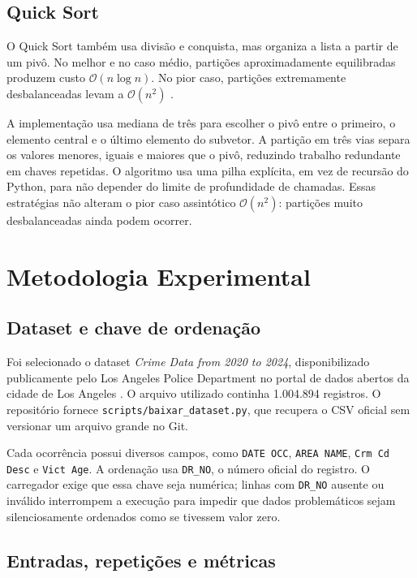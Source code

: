 \documentclass[12pt]{article}
\begin{document}
\subsection{Quick Sort}

O Quick Sort também usa divisão e conquista, mas organiza a lista a partir de
um pivô. No melhor e no caso médio, partições aproximadamente equilibradas
produzem custo $\mathcal{O}(n\log n)$. No pior caso, partições extremamente
desbalanceadas levam a $\mathcal{O}(n^2)$ \cite{cormen}.

A implementação usa mediana de três para escolher o pivô entre o primeiro, o
elemento central e o último elemento do subvetor. A partição em três vias
separa os valores menores, iguais e maiores que o pivô, reduzindo trabalho
redundante em chaves repetidas. O algoritmo usa uma pilha explícita, em vez de
recursão do Python, para não depender do limite de profundidade de chamadas.
Essas estratégias não alteram o pior caso assintótico $\mathcal{O}(n^2)$:
partições muito desbalanceadas ainda podem ocorrer.

\section{Metodologia Experimental}

\subsection{Dataset e chave de ordenação}

Foi selecionado o dataset \textit{Crime Data from 2020 to 2024}, disponibilizado
publicamente pelo Los Angeles Police Department no portal de dados abertos da
cidade de Los Angeles \cite{lapd}. O arquivo utilizado continha 1.004.894
registros. O repositório fornece
\texttt{scripts/baixar\_dataset.py}, que recupera o CSV oficial sem versionar um
arquivo grande no Git.

Cada ocorrência possui diversos campos, como \texttt{DATE OCC},
\texttt{AREA NAME}, \texttt{Crm Cd Desc} e \texttt{Vict Age}. A ordenação usa
\texttt{DR\_NO}, o número oficial do registro. O carregador exige que essa chave
seja numérica; linhas com \texttt{DR\_NO} ausente ou inválido interrompem a
execução para impedir que dados problemáticos sejam silenciosamente ordenados
como se tivessem valor zero.

\subsection{Entradas, repetições e métricas}
\end{document}
